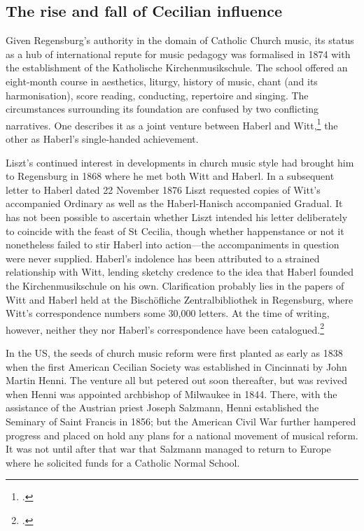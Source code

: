 \subsection{The rise and fall of Cecilian influence}
Given Regensburg's authority in the domain of Catholic Church music, its status as a hub of international repute for music pedagogy was formalised in 1874 with the establishment of the Katholische Kirchenmusikschule.
The school offered an eight-month course in \mbox{aesthetics}, liturgy, history of music, chant (and its harmonisation), score reading, conducting, repertoire and singing.
The circumstances surrounding its foundation are confused by two conflicting narratives.
One describes it as a joint venture between Haberl and Witt,\footcite[8]{BayreutherSituationdeutschenKirchenmusik2010} the other as Haberl's single-handed achievement.
\nowidow[2]

Liszt's continued interest in developments in church music style had brought him to Regensburg in 1868 where he met both Witt and Haberl.
In a subsequent letter to Haberl dated 22 November 1876 Liszt requested copies of Witt's accompanied Ordinary as well as the Haberl-Hanisch accompanied Gradual.
It has not been possible to ascertain whether Liszt intended his letter deliberately to coincide with the feast of St Cecilia, though whether happenstance or not it nonetheless failed to stir Haberl into action---the accompaniments in question were never supplied.
Haberl's indolence has been attributed to a strained relationship with Witt, lending sketchy credence to the idea that Haberl founded the Kirchenmusikschule on his own.
Clarification probably lies in the papers of Witt and Haberl held at the Bischöfliche Zentralbibliothek in Regensburg, where Witt's correspondence numbers some 30,000 letters.
At the time of writing, however, neither they nor Haberl's correspondence have been catalogued.\footcite[152, 170, 180]{LibbertFranzLisztund2001}

In the US, the seeds of church music reform were first planted as early as 1838 when the first American Cecilian Society was established in Cincinnati by John Martin Henni.
The venture all but petered out soon thereafter, but was revived when Henni was appointed archbishop of Milwaukee in 1844.
There, with the assistance of the Austrian priest Joseph Salzmann, Henni established the Seminary of Saint Francis in 1856; but  the American Civil War further hampered progress and placed on hold any plans for a national movement of musical reform.
It was not until after that war that Salzmann managed to return to Europe where he solicited funds for a Catholic Normal School.

